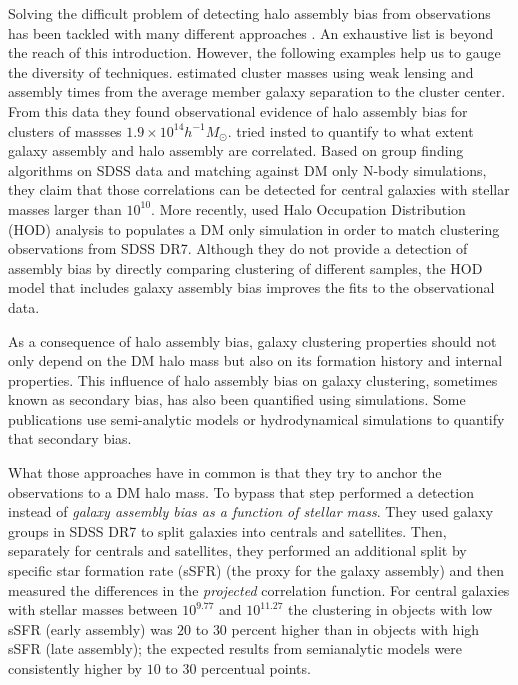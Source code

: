 \documentclass{aa}
\begin{document}
Solving the difficult problem of detecting halo assembly bias from
observations has been tackled with many different approaches \citep{2006ApJ...638L..55Y,2017MNRAS.470.4767B,2017MNRAS.470..551Z,2017MNRAS.468.3251D,2018MNRAS.477L...1N}. 
An exhaustive list is beyond the reach of this introduction.
However, the following examples  help us to gauge the diversity of techniques.
\citet{2016PhRvL.116d1301M} estimated cluster masses using weak lensing and
assembly times from the average member galaxy separation to the cluster center. 
From this data they found observational evidence of halo assembly bias
for clusters of massses $1.9\times 10^{14}h^{-1}M_\odot$.
\citet{2018MNRAS.478.4487T} tried insted to quantify to what extent
galaxy assembly and halo assembly are correlated.
Based on group finding algorithms on SDSS data and matching against DM
only N-body simulations, they claim that those correlations can be detected for central
galaxies with stellar masses larger than $10^{10}$\Msunh. 
More recently, \citet{2019MNRAS.485.1196Z} used Halo Occupation
Distribution (HOD) analysis to populates a DM only simulation in order
to match clustering observations from SDSS DR7. 
Although they do not provide a detection of assembly bias by directly
comparing clustering of different samples, 
the HOD model that includes galaxy assembly bias improves the fits to
the observational data. 


As a consequence of halo assembly bias, galaxy clustering properties should not only depend on
the DM halo mass but also on its formation history and internal
properties.
This influence of halo assembly bias on galaxy clustering, sometimes known as
secondary bias, has also been quantified using simulations. 
Some publications use semi-analytic models 
\citep{2007MNRAS.374.1303C,2014ApJ...794...74J,2019MNRAS.484.1133C}
or hydrodynamical simulations
\citep{2018MNRAS.480.3978A,2020MNRAS.492.2739X,2020MNRAS.tmp.1844M}
to quantify that secondary bias. 

What those approaches have in common is that they try to anchor the
observations to a DM halo mass. 
To bypass that step \citet{2013MNRAS.433..515W} performed a detection
instead of \emph{galaxy assembly bias as a function of stellar mass}.
They used galaxy groups in SDSS DR7 to split galaxies into centrals
and satellites.
Then, separately for centrals and satellites, they performed an additional
split by specific star formation rate (sSFR) (the proxy for the galaxy
assembly) and then measured the differences in the \emph{projected} correlation function.
For central galaxies with stellar masses between $10^{9.77}$ \Msun and
$10^{11.27}$ \Msun the clustering in objects with low sSFR (early
assembly) was $20$ to $30$ percent higher than in objects with high
sSFR (late assembly); the expected results from semianalytic models
were consistently higher by $10$ to $30$ percentual points. 
\end{document}
